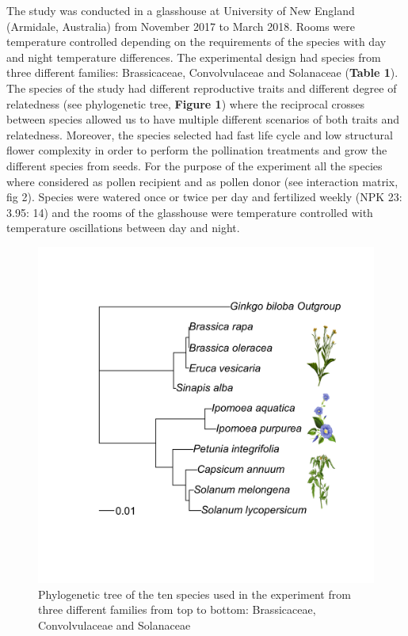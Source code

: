 \documentclass[11pt,a4paper]{article}
\begin{document}
The study was conducted in a glasshouse at University of New England
(Armidale, Australia) from November 2017 to March 2018. Rooms were
temperature controlled depending on the requirements of the species with
day and night temperature differences. The experimental design had
species from three different families: Brassicaceae, Convolvulaceae and
Solanaceae (\textbf{Table 1}). The species of the study had different
reproductive traits and different degree of relatedness (see
phylogenetic tree, \textbf{Figure 1}) where the reciprocal crosses
between species allowed us to have multiple different scenarios of both
traits and relatedness. Moreover, the species selected had fast life
cycle and low structural flower complexity in order to perform the
pollination treatments and grow the different species from seeds. For
the purpose of the experiment all the species where considered as pollen
recipient and as pollen donor (see interaction matrix, fig 2). Species
were watered once or twice per day and fertilized weekly (NPK 23: 3.95:
14) and the rooms of the glasshouse were temperature controlled with
temperature oscillations between day and night.

\newpage

\begin{figure}
\includegraphics[width=1\linewidth]{images/phylo_image} \caption{Phylogenetic tree of the ten species used in the experiment from three different families from top to bottom: Brassicaceae, Convolvulaceae and Solanaceae}\label{fig:unnamed-chunk-1}
\end{figure}
\end{document}
